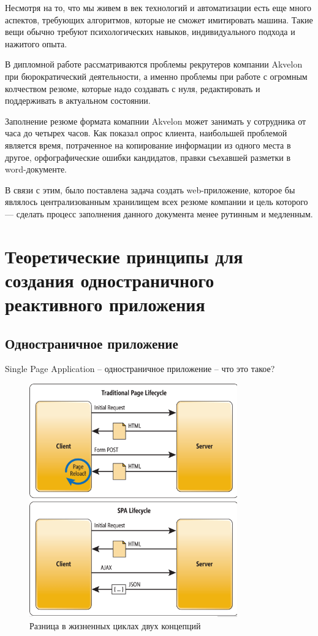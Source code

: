 \documentclass[a4paper,12pt]{diplom}
\begin{document}
\medskip

\tableofcontents[Содержание]


Несмотря на то, что мы живем в век технологий и автоматизации есть еще много аспектов, 
требующих алгоритмов, которые не сможет имитировать машина. Такие вещи обычно требуют 
психологических навыков, индивидуального подхода и нажитого опыта. 

В дипломной работе рассматриваются проблемы рекрутеров компании
 Akvelon при бюрократический деятельности, 
а именно проблемы при работе с огромным колчеством резюме, которые надо создавать с нуля, редактировать и
поддерживать в актуальном состоянии.

Заполнение резюме формата комапнии Akvelon
может занимать у сотрудника от часа до четырех часов. Как показал опрос клиента, наибольшей проблемой является время, потраченное
на копирование информации из одного места в другое, орфографические ошибки кандидатов, правки 
съехавшей разметки в word-документе.

В связи с этим, было поставлена задача создать web-приложение, которое бы являлось централизованным хранилищем
 всех резюме компании и цель которого — сделать процесс заполнения данного документа менее рутинным и медленным.

\chapter{Теоретические принципы для создания одностраничного реактивного приложения}

\section{Одностраничное приложение}
Single Page Application – одностраничное приложение – что это такое? 

\begin{figure}[!ht]
	\centering
	\includegraphics[width=0.8\textwidth]{resources/lifecycle.png}
	\caption{Разница в жизненных циклах двух концепций}
	\label{a}
\end{figure}
\end{document}
